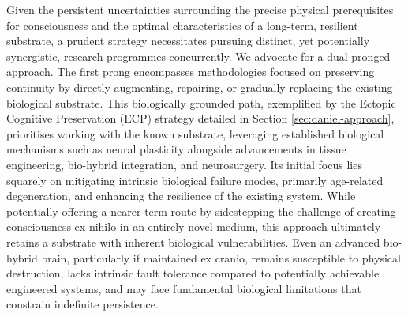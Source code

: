 \documentclass[10pt]{article}
\begin{document}
\begin{sloppypar}
  Given the persistent uncertainties surrounding the precise physical prerequisites for consciousness and the optimal characteristics of a long-term, resilient substrate, a prudent strategy necessitates pursuing distinct, yet potentially synergistic, research programmes concurrently. We advocate for a dual-pronged approach. The first prong encompasses methodologies focused on preserving continuity by directly augmenting, repairing, or gradually replacing the existing biological substrate. This biologically grounded path, exemplified by the Ectopic Cognitive Preservation (ECP) strategy detailed in Section \ref{sec:daniel-approach}, prioritises working with the known substrate, leveraging established biological mechanisms such as neural plasticity alongside advancements in tissue engineering, bio-hybrid integration, and neurosurgery. Its initial focus lies squarely on mitigating intrinsic biological failure modes, primarily age-related degeneration, and enhancing the resilience of the existing system. While potentially offering a nearer-term route by sidestepping the challenge of creating consciousness ex nihilo in an entirely novel medium, this approach ultimately retains a substrate with inherent biological vulnerabilities. Even an advanced bio-hybrid brain, particularly if maintained ex cranio, remains susceptible to physical destruction, lacks intrinsic fault tolerance compared to potentially achievable engineered systems, and may face fundamental biological limitations that constrain indefinite persistence.


\end{sloppypar}
\end{document}
